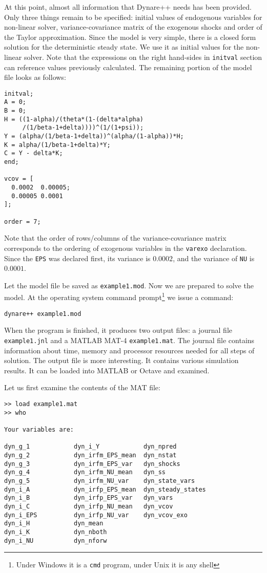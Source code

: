\documentclass[10pt]{article}
\begin{document}
At this point, almost all information that Dynare++ needs has been
provided. Only three things remain to be specified: initial values of
endogenous variables for non-linear solver, variance-covariance matrix
of the exogenous shocks and order of the Taylor approximation. Since
the model is very simple, there is a closed form solution for the
deterministic steady state. We use it as initial values for the
non-linear solver. Note that the expressions on the right hand-sides in
{\tt initval} section can reference values previously calculated. The
remaining portion of the model file looks as follows:

{\small
\begin{verbatim}
initval;
A = 0;
B = 0;
H = ((1-alpha)/(theta*(1-(delta*alpha)
     /(1/beta-1+delta))))^(1/(1+psi));
Y = (alpha/(1/beta-1+delta))^(alpha/(1-alpha))*H;
K = alpha/(1/beta-1+delta)*Y;
C = Y - delta*K;
end;

vcov = [
  0.0002  0.00005;
  0.00005 0.0001
];

order = 7;
\end{verbatim}
}

Note that the order of rows/columns of the variance-covariance matrix
corresponds to the ordering of exogenous variables in the {\tt varexo}
declaration. Since the {\tt EPS} was declared first, its variance is
$0.0002$, and the variance of {\tt NU} is $0.0001$.

Let the model file be saved as {\tt example1.mod}. Now we are prepared
to solve the model. At the operating system command
prompt\footnote{Under Windows it is a {\tt cmd} program, under Unix it
is any shell} we issue a command:

{\small
\begin{verbatim}
dynare++ example1.mod
\end{verbatim}
}

When the program is finished, it produces two output files: a journal
file {\tt example1.jnl} and a MATLAB MAT-4 {\tt example1.mat}. The
journal file contains information about time, memory and processor
resources needed for all steps of solution. The output file is more
interesting. It contains various simulation results. It can be loaded
into MATLAB or Octave and examined.

Let us first examine the contents of the MAT file:
{\small
\begin{verbatim}
>> load example1.mat
>> who

Your variables are:

dyn_g_1            dyn_i_Y            dyn_npred          
dyn_g_2            dyn_irfm_EPS_mean  dyn_nstat          
dyn_g_3            dyn_irfm_EPS_var   dyn_shocks         
dyn_g_4            dyn_irfm_NU_mean   dyn_ss             
dyn_g_5            dyn_irfm_NU_var    dyn_state_vars     
dyn_i_A            dyn_irfp_EPS_mean  dyn_steady_states  
dyn_i_B            dyn_irfp_EPS_var   dyn_vars           
dyn_i_C            dyn_irfp_NU_mean   dyn_vcov           
dyn_i_EPS          dyn_irfp_NU_var    dyn_vcov_exo       
dyn_i_H            dyn_mean           
dyn_i_K            dyn_nboth          
dyn_i_NU           dyn_nforw          
\end{verbatim}
}
\end{document}
